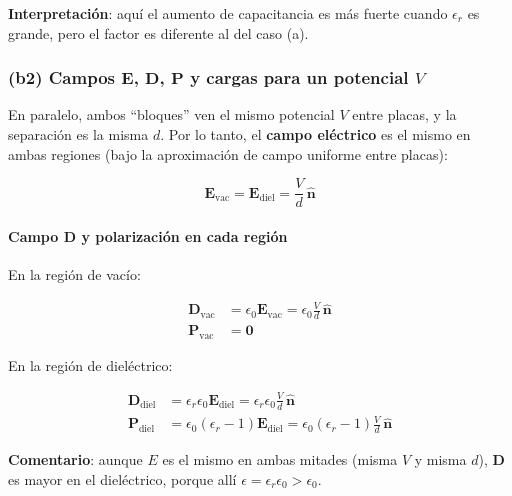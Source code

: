 \documentclass{article}
\begin{document}
\textbf{Interpretación}: aquí el aumento de capacitancia es más fuerte cuando $\epsilon_{r}$ es grande, pero el factor es diferente al del caso (a).

\subsubsection*{(b2) Campos $\mathbf{E}$, $\mathbf{D}$, $\mathbf{P}$ y cargas para un potencial $V$}

En paralelo, ambos “bloques” ven el mismo potencial $V$ entre placas, y la separación es la misma $d$. Por lo tanto, el \textbf{campo eléctrico} es el mismo en ambas regiones (bajo la aproximación de campo uniforme entre placas):

\begin{equation}
\mathbf{E}_{\text{vac}} = \mathbf{E}_{\text{diel}} = \frac{V}{d}\,\hat{\mathbf{n}}
\label{eq:E-b}
\end{equation}

\paragraph{Campo $\mathbf{D}$ y polarización en cada región}

En la región de vacío:

\begin{align}
\mathbf{D}_{\text{vac}} &= \epsilon_{0}\mathbf{E}_{\text{vac}}
= \epsilon_{0}\frac{V}{d}\,\hat{\mathbf{n}}
\label{eq:D-vac-b}\\[4pt]
\mathbf{P}_{\text{vac}} &= \mathbf{0}
\label{eq:P-vac-b}
\end{align}

En la región de dieléctrico:

\begin{align}
\mathbf{D}_{\text{diel}} &= \epsilon_{r}\epsilon_{0}\mathbf{E}_{\text{diel}}
= \epsilon_{r}\epsilon_{0}\frac{V}{d}\,\hat{\mathbf{n}}
\label{eq:D-diel-b}\\[4pt]
\mathbf{P}_{\text{diel}} &= \epsilon_{0}(\epsilon_{r}-1)\mathbf{E}_{\text{diel}}
= \epsilon_{0}(\epsilon_{r}-1)\frac{V}{d}\,\hat{\mathbf{n}}
\label{eq:P-diel-b}
\end{align}

\textbf{Comentario}: aunque $E$ es el mismo en ambas mitades (misma $V$ y misma $d$), $\mathbf{D}$ es mayor en el dieléctrico, porque allí $\epsilon = \epsilon_{r}\epsilon_{0} > \epsilon_{0}$.
\end{document}
